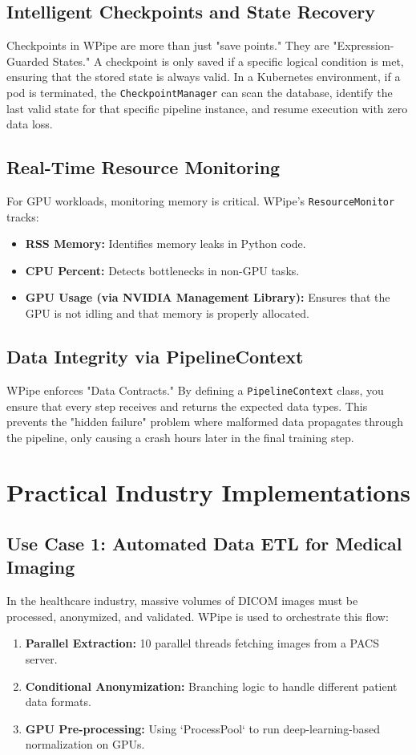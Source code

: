 \documentclass[12pt,a4paper]{report}
\begin{document}
\section{Intelligent Checkpoints and State Recovery}
Checkpoints in WPipe are more than just "save points." They are "Expression-Guarded States." A checkpoint is only saved if a specific logical condition is met, ensuring that the stored state is always valid. In a Kubernetes environment, if a pod is terminated, the \texttt{CheckpointManager} can scan the database, identify the last valid state for that specific pipeline instance, and resume execution with zero data loss.

\cleardoublepage
\section{Real-Time Resource Monitoring}
For GPU workloads, monitoring memory is critical. WPipe's \texttt{ResourceMonitor} tracks:
\begin{itemize}
    \item \textbf{RSS Memory:} Identifies memory leaks in Python code.
    \item \textbf{CPU Percent:} Detects bottlenecks in non-GPU tasks.
    \item \textbf{GPU Usage (via NVIDIA Management Library):} Ensures that the GPU is not idling and that memory is properly allocated.
\end{itemize}

\section{Data Integrity via PipelineContext}
WPipe enforces "Data Contracts." By defining a \texttt{PipelineContext} class, you ensure that every step receives and returns the expected data types. This prevents the "hidden failure" problem where malformed data propagates through the pipeline, only causing a crash hours later in the final training step.

\chapter{Practical Industry Implementations}
\cleardoublepage

\section{Use Case 1: Automated Data ETL for Medical Imaging}
In the healthcare industry, massive volumes of DICOM images must be processed, anonymized, and validated. WPipe is used to orchestrate this flow:
\begin{enumerate}
    \item \textbf{Parallel Extraction:} 10 parallel threads fetching images from a PACS server.
    \item \textbf{Conditional Anonymization:} Branching logic to handle different patient data formats.
    \item \textbf{GPU Pre-processing:} Using `ProcessPool` to run deep-learning-based normalization on GPUs.
\end{enumerate}
\end{document}
